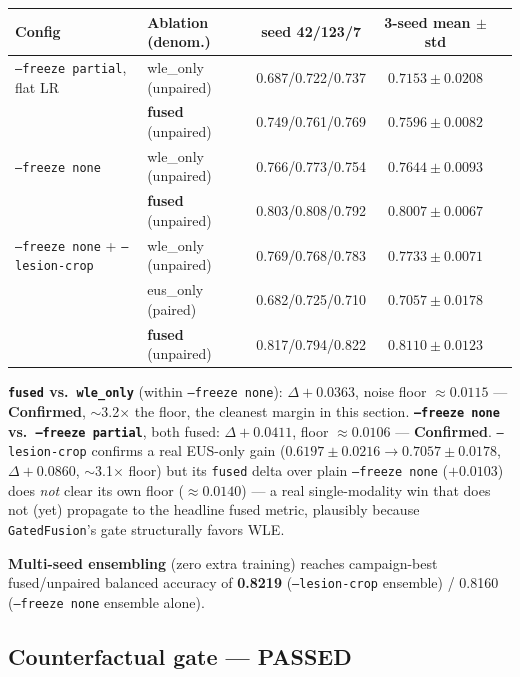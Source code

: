 \documentclass[10pt]{article}
\newcommand{\confirmed}{\textcolor{confirmgreen}{\textbf{Confirmed}}}
\begin{document}
\begin{center}
\begin{tabular}{llccc}
\toprule
Config & Ablation (denom.) & seed 42/123/7 & \textbf{3-seed mean $\pm$ std} \\
\midrule
\texttt{--freeze partial}, flat LR & wle\_only (unpaired) & 0.687/0.722/0.737 & $0.7153\pm0.0208$ \\
& \textbf{fused} (unpaired) & 0.749/0.761/0.769 & $\mathbf{0.7596\pm0.0082}$ \\
\texttt{--freeze none} & wle\_only (unpaired) & 0.766/0.773/0.754 & $0.7644\pm0.0093$ \\
& \textbf{fused} (unpaired) & 0.803/0.808/0.792 & $\mathbf{0.8007\pm0.0067}$ \\
\texttt{--freeze none} + \texttt{--lesion-crop} & wle\_only (unpaired) & 0.769/0.768/0.783 & $0.7733\pm0.0071$ \\
& eus\_only (paired) & 0.682/0.725/0.710 & $0.7057\pm0.0178$ \\
& \textbf{fused} (unpaired) & 0.817/0.794/0.822 & $\mathbf{0.8110\pm0.0123}$ \\
\bottomrule
\end{tabular}
\end{center}

\textbf{\texttt{fused} vs.\ \texttt{wle\_only}} (within \texttt{--freeze none}): $\Delta+0.0363$, noise floor
$\approx0.0115$ --- \confirmed{}, $\sim$3.2$\times$ the floor, the cleanest margin in this section.
\textbf{\texttt{--freeze none} vs.\ \texttt{--freeze partial}}, both fused: $\Delta+0.0411$, floor
$\approx0.0106$ --- \confirmed{}. \texttt{--lesion-crop} confirms a real EUS-only gain
($0.6197\pm0.0216 \to 0.7057\pm0.0178$, $\Delta+0.0860$, $\sim$3.1$\times$ floor) but its \texttt{fused}
delta over plain \texttt{--freeze none} ($+0.0103$) does \emph{not} clear its own floor ($\approx0.0140$) ---
a real single-modality win that does not (yet) propagate to the headline fused metric, plausibly because
\texttt{GatedFusion}'s gate structurally favors WLE.

\textbf{Multi-seed ensembling} (zero extra training) reaches campaign-best fused/unpaired balanced accuracy
of \textbf{0.8219} (\texttt{--lesion-crop} ensemble) / 0.8160 (\texttt{--freeze none} ensemble alone).

\subsection{Counterfactual gate --- PASSED}
\end{document}
